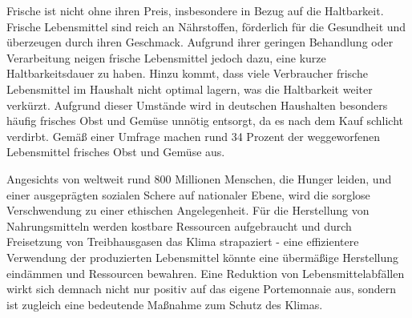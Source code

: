 Frische ist nicht ohne ihren Preis, insbesondere in Bezug auf die Haltbarkeit. Frische Lebensmittel sind reich an Nährstoffen, förderlich für die Gesundheit und überzeugen durch ihren Geschmack. Aufgrund ihrer geringen Behandlung oder Verarbeitung neigen frische Lebensmittel jedoch dazu, eine kurze Haltbarkeitsdauer zu haben. Hinzu kommt, dass viele Verbraucher frische Lebensmittel im Haushalt nicht optimal lagern, was die Haltbarkeit weiter verkürzt. Aufgrund dieser Umstände wird in deutschen Haushalten besonders häufig frisches Obst und Gemüse unnötig entsorgt, da es nach dem Kauf schlicht verdirbt. Gemäß einer Umfrage machen rund 34 Prozent der weggeworfenen Lebensmittel frisches Obst und Gemüse aus.

Angesichts von weltweit rund 800 Millionen Menschen, die Hunger leiden, und einer ausgeprägten sozialen Schere auf nationaler Ebene, wird die sorglose Verschwendung zu einer ethischen Angelegenheit. Für die Herstellung von Nahrungsmitteln werden kostbare Ressourcen aufgebraucht und durch Freisetzung von Treibhausgasen das Klima strapaziert - eine effizientere Verwendung der produzierten Lebensmittel könnte eine übermäßige Herstellung eindämmen und Ressourcen bewahren. Eine Reduktion von Lebensmittelabfällen wirkt sich demnach nicht nur positiv auf das eigene Portemonnaie aus, sondern ist zugleich eine bedeutende Maßnahme zum Schutz des Klimas.